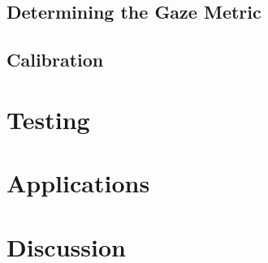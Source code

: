 \documentclass[annual]{acmsiggraph}
\begin{document}
\subsection{Determining the Gaze Metric}

\subsection{Calibration}

\section{Testing}

\section{Applications}

\section{Discussion}



\end{document}
